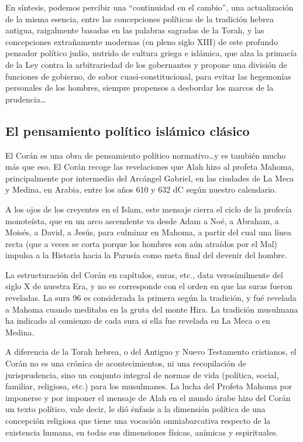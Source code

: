 \documentclass[
]{book}
\begin{document}
En síntesis, podemos percibir una ``continuidad en el cambio'', una actualización de la misma esencia, entre las concepciones políticas de la tradición hebrea antigua, raigalmente basadas en las palabras sagradas de la Torah, y las concepciones extrañamente modernas (en pleno siglo XIII) de este profundo pensador político judío, nutrido de cultura griega e islámica, que alza la primacía de la Ley contra la arbitrariedad de los gobernantes y propone una división de funciones de gobierno, de sabor cuasi-constitucional, para evitar las hegemonías personales de los hombres, siempre propensos a desbordar los marcos de la prudencia\ldots{}

\hypertarget{el-pensamiento-poluxedtico-isluxe1mico-cluxe1sico}{%
\subsection*{El pensamiento político islámico clásico}\label{el-pensamiento-poluxedtico-isluxe1mico-cluxe1sico}}

El Corán es una obra de pensamiento político normativo\ldots y es también mucho más que eso. El Corán recoge las revelaciones que Alah hizo al profeta Mahoma, principalmente por intermedio del Arcángel Gabriel, en las ciudades de La Meca y Medina, en Arabia, entre los años 610 y 632 dC según nuestro calendario.

A los ojos de los creyentes en el Islam, este mensaje cierra el ciclo de la profecía monoteísta, que en un arco ascendente va desde Adam a Noé, a Abraham, a Moisés, a David, a Jesús, para culminar en Mahoma, a partir del cual una línea recta (que a veces se corta porque los hombres son aún atraídos por el Mal) impulsa a la Historia hacia la Parusía como meta final del devenir del hombre.

La estructuración del Corán en capítulos, suras, etc., data verosímilmente del siglo X de nuestra Era, y no se corresponde con el orden en que las suras fueron reveladas. La sura 96 es considerada la primera según la tradición, y fué revelada a Mahoma cuando meditaba en la gruta del monte Hira. La tradición musulmana ha indicado al comienzo de cada sura si ella fue revelada en La Meca o en Medina.

A diferencia de la Torah hebrea, o del Antiguo y Nuevo Testamento cristianos, el Corán no es una crónica de acontecimientos, ni una recopilación de jurisprudencia, sino un conjunto integral de normas de vida (política, social, familiar, religiosa, etc.) para los musulmanes. La lucha del Profeta Mahoma por imponerse y por imponer el mensaje de Alah en el mundo árabe hizo del Corán un texto político, vale decir, le dió énfasis a la dimensión política de una concepción religiosa que tiene una vocación omniabarcativa respecto de la existencia humana, en todas sus dimensiones físicas, anímicas y espirituales.
\end{document}
